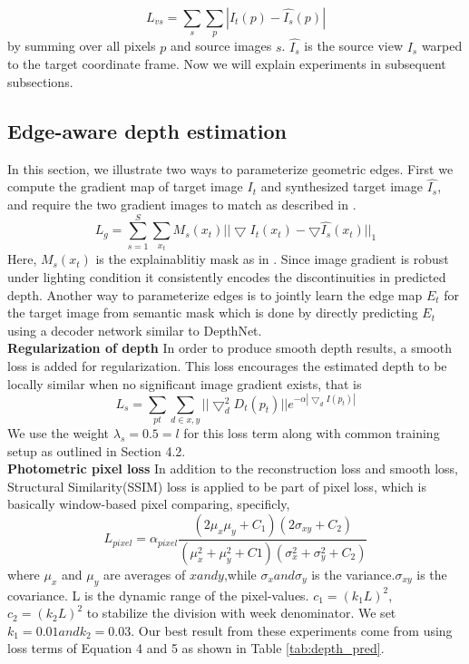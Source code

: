 \documentclass[10pt,twocolumn,letterpaper]{article}
\begin{document}
\begin{equation}
    L_{vs} = \sum_s\sum_p |I_t(p) - \hat{I_s}(p)|
\end{equation}
by summing over all pixels $p$ and source images $s$. $\hat{I_s}$ is the source view $I_s$ warped to the target coordinate frame. Now we will explain experiments in subsequent subsections.\\

\subsection{Edge-aware depth estimation}
In this section, we illustrate two ways to parameterize geometric edges. First we compute the gradient map of target image $I_t$ and synthesized target image $\hat{I_s}$, and require the two gradient images to match as described in \cite{yang2017unsupervised}.
\begin{equation}
    L_g = \sum_{s=1}^S\sum_{x_t}M_s(x_t)||\bigtriangledown I_t(x_t) - \bigtriangledown\hat{I_s}(x_t)||_1
\end{equation}
Here, $M_s(x_t)$ is the explainablitiy mask as in \cite{zhou2017unsupervised}. Since image gradient is robust under lighting condition it consistently encodes the discontinuities in predicted depth. Another way to parameterize edges is to jointly learn the edge map $E_t$ for the target image from semantic mask which is done by directly predicting $E_t$ using a decoder network similar to DepthNet.
\\
\textbf{Regularization of depth} In order to produce smooth depth results, a smooth loss is added for regularization. This loss encourages the estimated depth to be locally similar when no significant image gradient exists, that is 
\begin{equation}
    L_s = \sum_{pt}\sum_{d\in x, y}||\bigtriangledown_d^2D_t(p_t)||e^{-\alpha|\bigtriangledown_dI(p_t)|}
\end{equation}
We use the weight $\lambda_s = 0.5=l$ for this loss term along with common training setup as outlined in Section 4.2.\\
\noindent \textbf{Photometric pixel loss} In addition to the reconstruction loss and smooth loss, Structural Similarity(SSIM)\cite{wang2004image} loss is applied to be part of pixel loss, which is basically window-based pixel comparing, specificly,
\begin{equation}
    L_{pixel} = \alpha_{pixel} \frac{(2\mu_x\mu_y + C_1)(2\sigma_{xy} + C_2)}{(\mu_x^2 + \mu_y^2 + C1)(\sigma_x^2 + \sigma_y^2 + C_2)}
\end{equation}
where $\mu_x$ and $\mu_y$ are averages of $x and y$,while $\sigma_x and \sigma_y$ is the variance.$\sigma_{xy}$ is the covariance. L is the dynamic range of the pixel-values. $c_1=(k_1L)^2$,$c_2=(k_2L)^2$ to stabilize the division with week denominator. We set $k_1=0.01 and k_2=0.03$.
Our best result from these experiments come from using loss terms of Equation 4 and 5 as shown in Table \ref{tab:depth_pred}.
\end{document}
